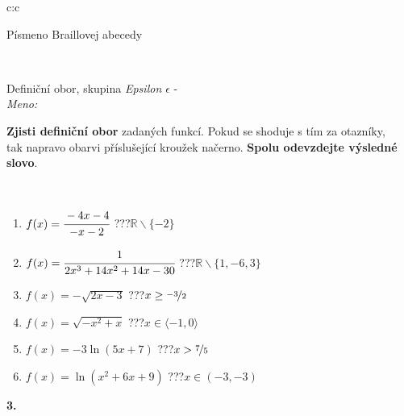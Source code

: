 \documentclass[10pt]{report}
\begin{document}
\begin{tabular}{c:c}
\begin{minipage}[c][104.5mm][t]{0.5\linewidth}
\begin{center}
\begin{minipage}{0.20\linewidth}
\begin{center}
{\small Písmeno Braillovej abecedy}
\end{center}
\end{minipage}
\end{center}
\end{minipage}
\\ \hdashline
\begin{minipage}[c][104.5mm][t]{0.5\linewidth}
\begin{center}
\vspace{7mm}
{\huge Definiční obor, skupina \textit{Epsilon $\epsilon$} -}\\[5mm]
\textit{Meno:}\phantom{xxxxxxxxxxxxxxxxxxxxxxxxxxxxxxxxxxxxxxxxxxxxxxxxxxxxxxxxxxxxxxxxx}\\[5mm]
\begin{minipage}{0.95\linewidth}
\textbf{Zjisti definiční obor} zadaných funkcí. Pokud se shoduje s tím za otazníky,\\tak napravo obarvi příslušející kroužek načerno. \textbf{Spolu odevzdejte výsledné slovo}.
\end{minipage}
\\[1mm]
\begin{minipage}{0.79\linewidth}
\begin{center}
\begin{varwidth}{\linewidth}
\begin{enumerate}
\normalsizerrr
\item $f(x)=\cfrac{-4x-4}{-x-2}$\quad \dotfill\; ???\;\dotfill \quad $\mathbb{R}\smallsetminus\{-2\}$
\item $f(x)=\cfrac{1}{2x^3+14x^2+14x-30}$\quad \dotfill\; ???\;\dotfill \quad $\mathbb{R}\smallsetminus\{1,-6,3\}$
\item $f(x)=-\sqrt{2x-3}$\quad \dotfill\; ???\;\dotfill \quad $x\geq\nicefrac{-3}{2}$
\item $f(x)=\sqrt{-x^2+x}$\quad \dotfill\; ???\;\dotfill \quad $x\in\langle-1 , 0\rangle$
\item $f(x)=-3\ln{(5x+7)}$\quad \dotfill\; ???\;\dotfill \quad $x>\nicefrac{7}{5}$
\item $f(x)=\ln{(x^2+6x+9)}$\quad \dotfill\; ???\;\dotfill \quad $x\in(-3 , -3)$
\end{enumerate}
\end{varwidth}
\end{center}
\end{minipage}
\begin{minipage}{0.20\linewidth}
\begin{center}
{\Huge\bfseries 3.} \\[2mm]

\end{center}
\end{minipage}
\end{center}
\end{minipage}
\end{tabular}
\end{document}
